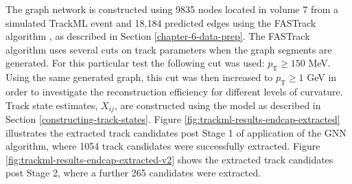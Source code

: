 The graph network is constructed using 9835 nodes located in volume 7 from a simulated TrackML event and 18,184 predicted edges using the FASTrack algorithm \cite{Dmitry-fasttrack-addtest}, as described in Section \ref{chapter-6-data-prep}. The FASTrack algorithm uses several cuts on track parameters when the graph segments are generated. For this particular test the following cut was used: $p_{\text{T}} \ge 150$ MeV. Using the same generated graph, this cut was then increased to $p_{\text{T}} \ge 1$ GeV in order to investigate the reconstruction efficiency for different levels of curvature. Track state estimates, $X_{ij}$, are constructed using the model as described in Section \ref{constructing-track-states}. Figure \ref{fig:trackml-results-endcap-extracted} illustrates the extracted track candidates post Stage 1 of application of the GNN algorithm, where 1054 track candidates were successfully extracted. Figure \ref{fig:trackml-results-endcap-extracted-v2} shows the extracted track candidates post Stage 2, where a further 265 candidates were extracted.

